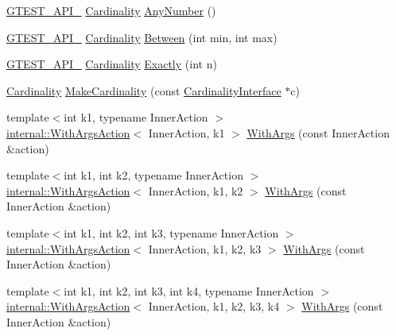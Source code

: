 \begin{DoxyCompactItemize}
\item 
\hyperlink{gtest-port_8h_aa73be6f0ba4a7456180a94904ce17790}{G\+T\+E\+S\+T\+\_\+\+A\+P\+I\+\_\+} \hyperlink{classtesting_1_1_cardinality}{Cardinality} \hyperlink{namespacetesting_aa1f8a6371097e1e9b8d6866020f35252}{Any\+Number} ()
\item 
\hyperlink{gtest-port_8h_aa73be6f0ba4a7456180a94904ce17790}{G\+T\+E\+S\+T\+\_\+\+A\+P\+I\+\_\+} \hyperlink{classtesting_1_1_cardinality}{Cardinality} \hyperlink{namespacetesting_a3bb2d3cdd3fdf5b4be1480fce549918e}{Between} (int min, int max)
\item 
\hyperlink{gtest-port_8h_aa73be6f0ba4a7456180a94904ce17790}{G\+T\+E\+S\+T\+\_\+\+A\+P\+I\+\_\+} \hyperlink{classtesting_1_1_cardinality}{Cardinality} \hyperlink{namespacetesting_aa9b1b32ba9e8d3db8ac0af0fc8785c8d}{Exactly} (int n)
\item 
\hyperlink{classtesting_1_1_cardinality}{Cardinality} \hyperlink{namespacetesting_af567006969875ab70fc6aa3029576774}{Make\+Cardinality} (const \hyperlink{classtesting_1_1_cardinality_interface}{Cardinality\+Interface} $\ast$c)
\item 
{\footnotesize template$<$int k1, typename Inner\+Action $>$ }\\\hyperlink{classtesting_1_1internal_1_1_with_args_action}{internal\+::\+With\+Args\+Action}$<$ Inner\+Action, k1 $>$ \hyperlink{namespacetesting_a3bd9eef13bee9065b19d3cd571829c7c}{With\+Args} (const Inner\+Action \&action)
\item 
{\footnotesize template$<$int k1, int k2, typename Inner\+Action $>$ }\\\hyperlink{classtesting_1_1internal_1_1_with_args_action}{internal\+::\+With\+Args\+Action}$<$ Inner\+Action, k1, k2 $>$ \hyperlink{namespacetesting_aa82fc09250ba172220e6fb7e77249e74}{With\+Args} (const Inner\+Action \&action)
\item 
{\footnotesize template$<$int k1, int k2, int k3, typename Inner\+Action $>$ }\\\hyperlink{classtesting_1_1internal_1_1_with_args_action}{internal\+::\+With\+Args\+Action}$<$ Inner\+Action, k1, k2, k3 $>$ \hyperlink{namespacetesting_a999614cb785165b9a44a9a95a3753407}{With\+Args} (const Inner\+Action \&action)
\item 
{\footnotesize template$<$int k1, int k2, int k3, int k4, typename Inner\+Action $>$ }\\\hyperlink{classtesting_1_1internal_1_1_with_args_action}{internal\+::\+With\+Args\+Action}$<$ Inner\+Action, k1, k2, k3, k4 $>$ \hyperlink{namespacetesting_a646a2e4ac7866ee8c486cb167ba9b45e}{With\+Args} (const Inner\+Action \&action)

\end{DoxyCompactItemize}

